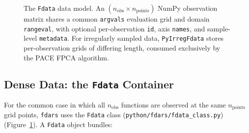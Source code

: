 \begin{figure}[ht]
\caption{The \texttt{Fdata} data model.  An $(n_\mathrm{obs} \times
n_\mathrm{points})$ NumPy observation matrix shares a common \texttt{argvals}
evaluation grid and domain \texttt{rangeval}, with optional per-observation
\texttt{id}, axis \texttt{names}, and sample-level \texttt{metadata}.
For irregularly sampled data, \texttt{PyIrregFdata} stores per-observation
grids of differing length, consumed exclusively by the PACE FPCA algorithm.}
\label{fig:datamodel}
\end{figure}

\subsection{Dense Data: the \texttt{Fdata} Container}

For the common case in which all $n_\mathrm{obs}$ functions are observed at
the same $n_\mathrm{points}$ grid points, \texttt{fdars} uses the
\texttt{Fdata} class (\texttt{python/fdars/fdata\_class.py})
(Figure~\ref{fig:datamodel}).  A \texttt{Fdata} object bundles:

